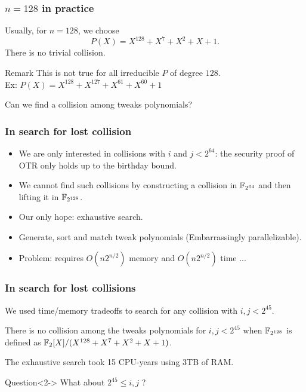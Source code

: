 \documentclass{beamer}
\begin{document}
				\begin{frame}
					\frametitle{$n = 128$ in practice}

					Usually, for $n = 128$, we choose
					\[
					P(X) = X^{128}+X^{7}+X^{2}+X+1.
					\]
					There is no trivial collision. 
					\begin{block}{Remark}
						This is not true for all irreducible $P$ of degree $128$.\\
						Ex: $P(X)=X^{128}+X^{127}+X^{61}+X^{60}+1$
					\end{block}
		
					Can we find a collision among tweaks polynomials?
				\end{frame}

				\begin{frame}
					\frametitle{In search for lost collision}

					\begin{itemize}
						\item We are only interested in collisions with $i$ and $j < 2^{64}$: the security proof of OTR only holds up to the birthday bound.
			
						\item<2-> We cannot find such collisions by constructing a collision in $\mathbb{F}_{2^{64}}$ and then lifting it in $\mathbb{F}_{2^{128}}$.
			
						\item<3-> Our only hope: exhaustive search. 
			
						\item<4-> Generate, sort and match tweak polynomials (Embarrassingly parallelizable).
			
						\item<5-> Problem: requires $O(n 2^{n/2})$ memory and $O(n 2^{n/2})$ time ...
					\end{itemize}
				\end{frame}

				\begin{frame}
					\frametitle{In search for lost collisions}



					We used time/memory tradeoffs to search for any collision with $i, j < 2^{45}$.

					\begin{theorem}
						There is no collision among the tweaks polynomials for $i, j < 2^{45}$ when $\mathbb{F}_{2^{128}}$ is defined as $\mathbb{F}_2[X]/(X^{128}+X^{7}+X^{2}+X+1)$.
					\end{theorem}
		
					The exhaustive search took 15 CPU-years using 3TB of RAM.


					\begin{exampleblock}{Question}<2->
						What about $2^{45} \leq i, j$ ?
					\end{exampleblock}
				\end{frame}
\end{document}
